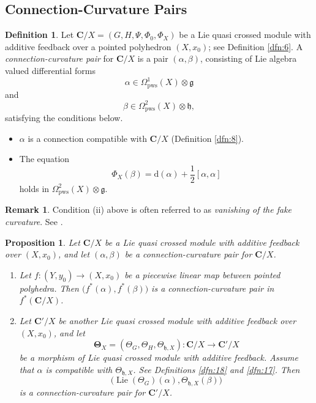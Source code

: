 \documentclass[10pt, a4paper]{amsart}
\newtheorem{prop}[equation]{Proposition}
\theoremstyle{definition}
\newtheorem{dfn}[equation]{Definition}
\newtheorem{rem}[equation]{Remark}
\numberwithin{equation}{section}
\newcommand{\opn}{\operatorname}
\newcommand{\rmitem}[1]{\item[\text{\textup{(#1)}}]}
\newcommand{\mfrak}[1]{\mathfrak{#1}}
\newcommand{\mbf}[1]{\mathbf{#1}}
\newcommand{\mrm}[1]{\mathrm{#1}}
\newcommand{\smfrac}[2]{{\textstyle \frac{#1}{#2}}}
\newcommand{\tup}[1]{\textup{#1}}
\newcommand{\bsym}[1]{\boldsymbol{#1}}
\newcommand{\g}{\mfrak{g}}
\newcommand{\h}{\mfrak{h}}
\renewcommand{\d}{\mrm{d}}
\newcommand{\lb}{\linebreak}
\begin{document}
\subsection{Connection-Curvature Pairs} \label{subsec:ccpair}

\begin{dfn} \label{dfn:19}
Let $\mbf{C} / X = (G, H, \Psi, \Phi_0, \Phi_X)$ be a 
Lie quasi crossed module with additive feedback over a pointed 
polyhedron $(X, x_0)$; see Definition \ref{dfn:6}. A 
{\em connection-curvature pair} 
for $\mbf{C} / X$ is a pair $(\alpha, \beta)$, consisting of Lie
algebra valued differential forms
\[ \alpha \in \Omega_{\mrm{pws}}^1(X) \otimes \g \]
and
\[ \beta \in \Omega_{\mrm{pws}}^2(X) \otimes \h , \]
satisfying the conditions below.
\begin{itemize}
\rmitem{i} $\alpha$ is a connection compatible with $\mbf{C} / X$
(Definition \ref{dfn:8}).

\rmitem{ii} The equation
\[ \Phi_X(\beta) = \d (\alpha) + \smfrac{1}{2} [\alpha, \alpha] \]
holds in $\Omega_{\mrm{pws}}^2(X) \otimes \g$.
\end{itemize}
\end{dfn}

\begin{rem}
Condition (ii) above is often referred to as 
{\em vanishing of the fake curvature}. See \cite{BM, BS}.
\end{rem}

\begin{prop} \label{prop:11}
Let $\mbf{C} / X$ be a Lie quasi crossed module with additive feedback over
$(X, x_0)$, and let $(\alpha, \beta)$ be a connection-curvature pair for
$\mbf{C} / X$. 
\begin{enumerate}
\item Let $f : (Y, y_0) \to (X, x_0)$ be a piecewise linear map between pointed
polyhedra. Then $\bigl( f^*(\alpha), f^*(\beta) \bigr)$ 
is a connection-curvature pair in \lb
$f^* (\mbf{C} / X)$.
%
\item Let $\mbf{C}' / X$ be another Lie quasi crossed module with additive
feedback over $(X, x_0)$, and let
\[ \bsym{\Theta}_X = (\Theta_G, \Theta_H, \Theta_{\h, X}) : \mbf{C} / X 
\to \mbf{C}' / X \]
be a morphism of Lie quasi crossed module with additive
feedback. Assume that $\alpha$ is
compatible with $\Theta_{\h, X}$. See Definitions \tup{\ref{dfn:18}} and
\tup{\ref{dfn:17}}. Then 
\[ \bigl( \opn{Lie}(\Theta_G)(\alpha), \Theta_{\h, X}(\beta) \bigr) \]
is a connection-curvature pair for $\mbf{C}' / X$.
\end{enumerate}
\end{prop}
\end{document}
